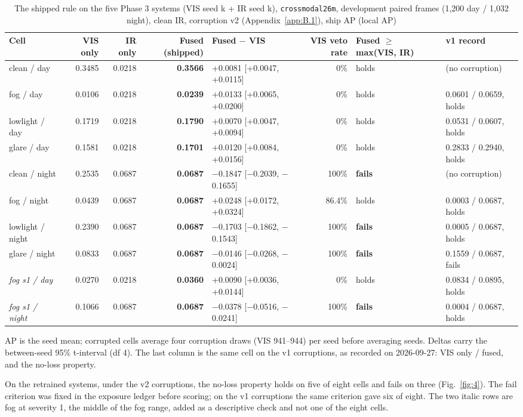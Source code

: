 \documentclass[journal,onecolumn]{IEEEtran}
\begin{document}
\begin{table}[htbp]
\centering
\footnotesize
\caption{The shipped rule on the five Phase 3 systems (VIS seed k + IR seed k), \texttt{crossmodal26m}, development paired frames (1,200 day / 1,032 night), clean IR, corruption v2 (Appendix~\ref{app:B.1}), ship AP (local AP)}
\label{tab:7}
\setlength{\tabcolsep}{3pt}
\begin{adjustbox}{max width=\linewidth}
\begin{tabular}{lrrrlrll}
\toprule
Cell & VIS only & IR only & Fused (shipped) & Fused $-$ VIS & VIS veto rate & Fused $\geq$ max(VIS, IR) & v1 record \\
\midrule
clean / day & 0.3485 & 0.0218 & \textbf{0.3566} & +0.0081 [+0.0047, +0.0115] & 0\% & holds & (no corruption) \\
fog / day & 0.0106 & 0.0218 & \textbf{0.0239} & +0.0133 [+0.0065, +0.0200] & 0\% & holds & 0.0601 / 0.0659, holds \\
lowlight / day & 0.1719 & 0.0218 & \textbf{0.1790} & +0.0070 [+0.0047, +0.0094] & 0\% & holds & 0.0531 / 0.0607, holds \\
glare / day & 0.1581 & 0.0218 & \textbf{0.1701} & +0.0120 [+0.0084, +0.0156] & 0\% & holds & 0.2833 / 0.2940, holds \\
clean / night & 0.2535 & 0.0687 & \textbf{0.0687} & $-$0.1847 [$-$0.2039, $-$0.1655] & 100\% & \textbf{fails} & (no corruption) \\
fog / night & 0.0439 & 0.0687 & \textbf{0.0687} & +0.0248 [+0.0172, +0.0324] & 86.4\% & holds & 0.0003 / 0.0687, holds \\
lowlight / night & 0.2390 & 0.0687 & \textbf{0.0687} & $-$0.1703 [$-$0.1862, $-$0.1543] & 100\% & \textbf{fails} & 0.0005 / 0.0687, holds \\
glare / night & 0.0833 & 0.0687 & \textbf{0.0687} & $-$0.0146 [$-$0.0268, $-$0.0024] & 100\% & \textbf{fails} & 0.1559 / 0.0687, fails \\
\emph{fog s1 / day} & 0.0270 & 0.0218 & \textbf{0.0360} & +0.0090 [+0.0036, +0.0144] & 0\% & holds & 0.0834 / 0.0895, holds \\
\emph{fog s1 / night} & 0.1066 & 0.0687 & \textbf{0.0687} & $-$0.0378 [$-$0.0516, $-$0.0241] & 100\% & \textbf{fails} & 0.0004 / 0.0687, holds \\
\bottomrule
\end{tabular}
\end{adjustbox}
\par\smallskip\raggedright\footnotesize AP is the seed mean; corrupted cells average four corruption draws (VIS 941--944) per seed before averaging seeds. Deltas carry the between-seed 95\% t-interval (df 4). The last column is the same cell on the v1 corruptions, as recorded on 2026-09-27: VIS only / fused, and the no-loss property.
\end{table}
On the retrained systems, under the v2 corruptions, the no-loss property holds on five of eight cells and fails on three (Fig.~\ref{fig:4}). The fail criterion was fixed in the exposure ledger before scoring; on the v1 corruptions the same criterion gave six of eight. The two italic rows are fog at severity 1, the middle of the fog range, added as a descriptive check and not one of the eight cells.
\end{document}

